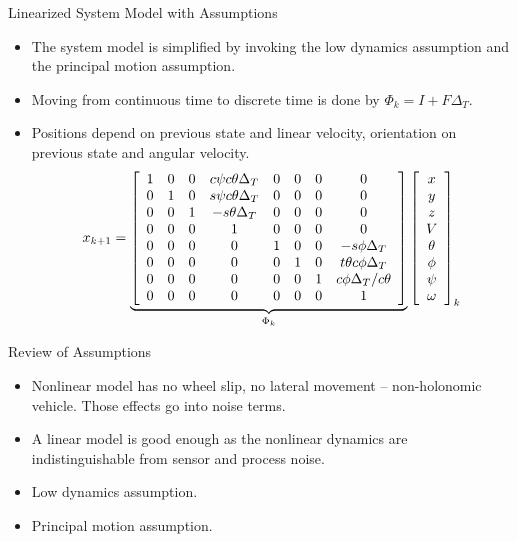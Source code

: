 \documentclass[hyperref={pdfpagelabels=false}]{beamer}
\begin{document}
\begin{frame}{Linearized System Model with Assumptions}
\begin{itemize}
\item The system model is simplified by invoking the low dynamics assumption and the principal motion assumption.
\item Moving from continuous time to discrete time is done by $\Phi_k = I + F\Delta_T$.
\item Positions depend on previous state and linear velocity, orientation on previous state and angular velocity.
\begin{align*}
x_{k+1} = 
\underbrace{\left[\begin{array}{c c c c c c c c}
1 & 0 & 0 & c\psi c\theta \Delta_T & 0 & 0 & 0 & 0 \\
0 & 1 & 0 & s\psi c\theta \Delta_T & 0 & 0 & 0 & 0\\
0 & 0 & 1 & -s\theta \Delta_T & 0 & 0 & 0 & 0\\
0 & 0 & 0 & 1 & 0 & 0 & 0 & 0 \\
0 & 0 & 0 & 0 & 1 & 0 & 0 & -s\phi \Delta_T \\
0 & 0 & 0 & 0 & 0 & 1 & 0 & t\theta c\phi \Delta_T \\
0 & 0 & 0 & 0 & 0 & 0 & 1 & c\phi \Delta_T/c\theta \\
0 & 0 & 0 & 0 & 0 & 0 & 0 & 1
\end{array}\right]}_{\Phi_k}
\left[\begin{array}{c}
x \\ y \\ z \\ V \\ \theta \\ \phi \\ \psi \\ \omega
\end{array}\right]_k
\end{align*}
\end{itemize}
\end{frame}

\begin{frame}{Review of Assumptions}
\begin{itemize}
\item Nonlinear model has no wheel slip, no lateral movement -- non-holonomic vehicle. Those effects go into noise terms.
\item A linear model is good enough as the nonlinear dynamics are indistinguishable from sensor and process noise.
\item Low dynamics assumption.
\item Principal motion assumption.
\end{itemize}
\end{frame}
\end{document}
